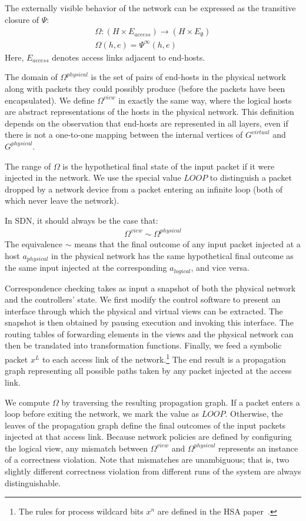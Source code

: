 {The externally visible behavior of the network can be expressed as the
transitive closure of $\Psi$:
\begin{align*}
\Omega: (H \times E_{access}) \rightarrow (H \times E_{\emptyset}) \\
\Omega(h,e) = \Psi^{\infty}(h,e)
\end{align*}
Here, $E_{access}$ denotes access links adjacent to end-hosts.

The domain of $\Omega^{physical}$ is the set of pairs of end-hosts in the
physical network along with packets they could possibly produce (before
the packets have been encapsulated). We define $\Omega^{view}$ in exactly the same way, where
the logical hosts are abstract representations of the hosts in the physical
network. This definition depends on the observation that end-hosts are represented
in all layers, even if there is not a one-to-one mapping between the
internal vertices of $G^{virtual}$ and $G^{physical}$.

The range of $\Omega$ is the hypothetical final state of the
input packet if it were injected in the network.
We use the special value $LOOP$ to distinguish
a packet dropped by a network device from a packet entering an
infinite loop (both of which never leave the network).

In SDN, it should always be the case that:
\begin{align*}
\Omega^{view} \sim \Omega^{physical}
\end{align*}
The equivalence $\sim$ means that the final outcome of any input packet
injected at a host $a_{physical}$ in the physical network has the same hypothetical final outcome as
the same input injected at the corresponding $a_{logical}$, and vice versa.

Correspondence checking takes as input a
snapshot of both the physical network and the
controllers' state. We first modify the control software to present an
interface through which the physical and virtual views can be
extracted. The snapshot is
then obtained by pausing execution and invoking this interface.
The routing tables of forwarding elements in the views and the physical
network can then be translated into transformation functions.
Finally, we feed a symbolic packet $x^L$ to each access link of the
network.\footnote{The rules for process wildcard bits $x^n$ are defined in
the HSA paper~\cite{hsa}.} The end result is a propagation graph representing
all possible paths taken by any packet injected
at the access link.

We compute $\Omega$ by traversing the resulting propagation graph. If a packet
enters a loop before exiting the network, we mark the value as
$LOOP$. Otherwise,
the leaves of the propagation graph define the final outcomes of the input
packets injected at that access link. Because network policies are defined by
configuring the logical view, any mismatch between $\Omega^{view}$ and $\Omega^{physical}$
represents an instance of a correctness violation. Note that mismatches are
unambiguous; that is, two slightly different correctness violation from
different runs of the system are always distinguishable.

}
